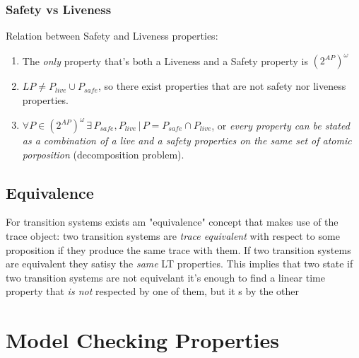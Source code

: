 \documentclass{article}
\begin{document}
					
				\subsubsection{Safety vs Liveness}
					Relation between Safety and Liveness properties:
					\begin{enumerate}
						\item The \emph{only} property that's both a Liveness and a Safety property is $(2^{AP})^{\omega}$
						\item $LP \neq P_{live} \cup P_{safe}$, so there exist properties that are not safety nor liveness properties.
						\item $\forall P \in (2^{AP})^{\omega} \,\exists\, P_{safe}, P_{live} \,\vert\, P = P_{safe} \cap P_{live}$, or \emph{every property can be stated as a combination of a live and a safety properties on the same set of atomic porposition} (decomposition problem).
					\end{enumerate}
					
			\subsection{Equivalence}
				For transition systems exists am "equivalence" concept that makes use of the trace object: two transition systems are \emph{trace equivalent} with respect to some proposition if they produce the same trace with them. If two transition systems are equivalent they satisy the \emph{same} LT properties. This implies that two state if two transition systems are not equivelant it's enough to find a linear time property that \emph{is not} respected by one of them, but it s by the other

		\section{Model Checking Properties}
\end{document}
